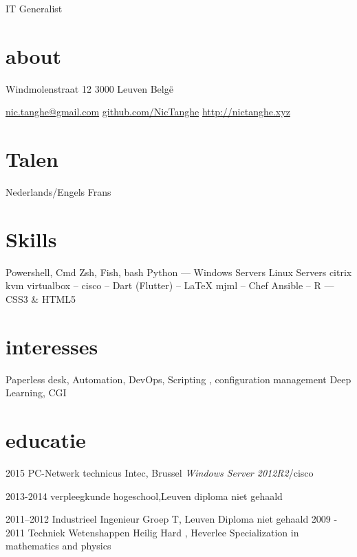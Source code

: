 \documentclass[]{friggeri-cv}
\begin{document}
       {IT Generalist}


\begin{aside}
  \section{about}
    Windmolenstraat 12
    3000 Leuven
    Belgë

    \href{nic.tanghe@gmail.com}{nic.tanghe@gmail.com}
    \href{https://github.com/NicTanghe}{github.com/NicTanghe}
    \href{http://nictanghe.xyz}{http://nictanghe.xyz}
    \section{Talen}
    Nederlands/Engels
    Frans
    \section{Skills}
    Powershell, Cmd
    Zsh, Fish, bash
    Python 
    ---
    Windows Servers
    Linux Servers
    citrix
    kvm
    virtualbox
    --
    cisco
    --
    Dart
    (Flutter)
    --
    \LaTeX
    mjml
    --
    Chef
    Ansible
    --
     \CC R
    ---
    CSS3 \& HTML5
  \end{aside}
    
\section{interesses}

Paperless desk, Automation, DevOps, Scripting , configuration management       \newline
Deep Learning, CGI

\section{educatie}

\begin{entrylist}

  \entry
    {2015}
    {PC-Netwerk technicus}
    {Intec, Brussel}
    {\emph {Windows Server 2012R2}/cisco }


  \entry
    {2013-2014}
    {verpleegkunde}
    {hogeschool,Leuven}
    {diploma niet gehaald}

  \entry
    {2011–2012}
    {Industrieel Ingenieur}
    {Groep T, Leuven}
    {Diploma niet gehaald}
  \entry
    {2009 - 2011}
    {Techniek Wetenshappen}
    {Heilig Hard , Heverlee}
    {Specialization in mathematics and physics}
\end{entrylist}
\end{document}
